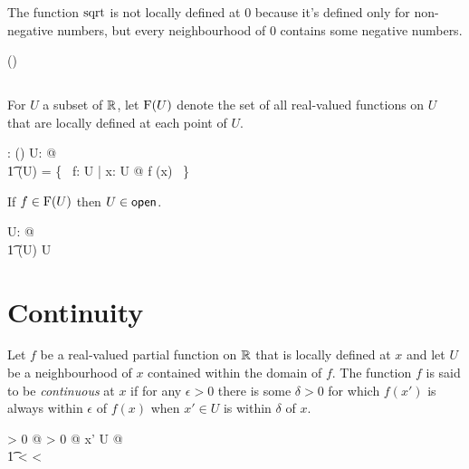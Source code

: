 \documentclass[11pt, oneside]{article}
\begin{document}
\begin{remark}
The function $\operatorname{sqrt}$ is not locally defined at $0$ because it's defined only for non-negative numbers,
but every neighbourhood of $0$ contains some negative numbers.

\begin{zed}
	\sqrtR \notin \FunR(\zeroR)
\end{zed}

\end{remark}

\subsection{}

For $U$ a subset of $\mathbb{R}$,
let $\operatorname{F}(U)$ denote the set of all real-valued functions on $U$ that are locally defined at each point of $U$.

\begin{axdef}
	\FunPR: \power \R \fun \power (\R \pfun \R)
\where
	\forall U: \power \R @ \\
	\t1	\FunPR(U) = \{~ f: U \fun \R | \forall x: U @ f \in \FunR(x) ~\}
\end{axdef}

\begin{remark}
If $f \in \operatorname{F}(U)$ then $U \in \mathsf{open}$.

\begin{zed}
	\forall U: \power \R @ \\
	\t1	\FunPR(U) \neq \emptyset \implies U \in \openR
\end{zed}

\end{remark}

\section{Continuity}

Let $f$ be a real-valued partial function on $\mathbb{R}$ 
that is locally defined at $x$ and let $U$ be a neighbourhood of $x$
contained within the domain of $f$.
The function $f$ is said to be {\it continuous} at $x$ if 
for any $\epsilon > 0$ there is some $\delta > 0$ for which 
$f(x')$ is always within $\epsilon$ of $f(x)$
when $x' \in U$ is within $\delta$ of $x$.
\begin{argue}
\forall \epsilon > 0 @ \exists \delta > 0 @ \forall x' \in U @ \\
\t1	 < \delta \implies {} < \epsilon
\end{argue}
\end{document}
